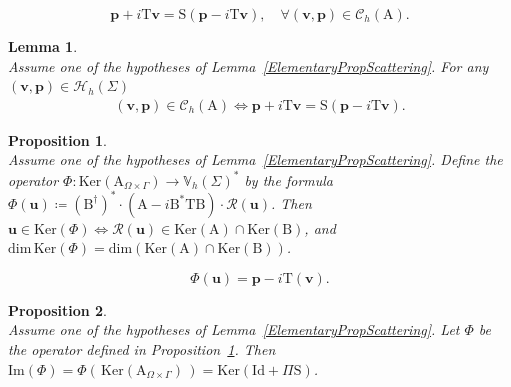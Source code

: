 \documentclass[10pt,a4paper]{amsart}
\newtheorem{lem}{Lemma}
\newtheorem{prop}{Proposition}
\newcommand{\Id}{\mathrm{Id}}
\newcommand{\bp}{\boldsymbol{p}}
\newcommand{\bu}{\boldsymbol{u}}
\newcommand{\bv}{\boldsymbol{v}}
\newcommand{\mA}{\mathrm{A}}
\newcommand{\mB}{\mathrm{B}}
\newcommand{\mS}{\mathrm{S}}
\newcommand{\mT}{\mathrm{T}}
\newcommand{\mbV}{\mathbb{V}}
\newcommand{\mrm}{\mathrm}
\begin{document}
  \begin{equation}\label{ScatteringOperator}
    \bp+i\mT\bv = \mS(\bp-i\mT\bv),\quad \forall (\bv,\bp)\in
    \mathscr{C}_h(\mA).
  \end{equation}

\begin{lem}\label{ScatteringOperatorChara}\quad\\
  Assume one of the hypotheses of Lemma~\ref{ElementaryPropScattering}. For any \((\bv,\bp)\in \mathscr{H}_h(\Sigma)\)
  \begin{align*}
    (\bv,\bp)\in \mathscr{C}_h(\mA) \Longleftrightarrow \bp+i\mT\bv = \mS(\bp-i\mT\bv). 
  \end{align*}
\end{lem}

\begin{prop}\label{IsomorphismKernels1}\quad\\
  Assume one of the hypotheses of Lemma~\ref{ElementaryPropScattering}. Define the operator $\Phi\colon 
  \mrm{Ker}(\mA_{\Omega\times\Gamma})\to \mbV_h(\Sigma)^*$ by the formula
  $\Phi(\bu) \coloneq (\mB^{\dagger})^*\cdot(\mA-i\mB^*\mT\mB)\cdot\mathcal{R}(\bu)$.
  Then $\bu\in \mrm{Ker}(\Phi)\iff\mathcal{R}(\bu)\in \mrm{Ker}(\mA)\cap \mrm{Ker}(\mB)$, 
  and $\mrm{dim}\,\mrm{Ker}(\Phi) = \mrm{dim}(\mrm{Ker}(\mA)\cap \mrm{Ker}(\mB))$.
\end{prop}

\begin{equation}\label{IdentitePhiIntermediaire}
  \Phi(\bu) = \bp-i\mT(\bv).
\end{equation}

\begin{prop}\label{IsomorphismKernels2}\quad\\
  Assume one of the hypotheses of Lemma~\ref{ElementaryPropScattering}. 
  Let $\Phi$ be the operator defined in Proposition~\ref{IsomorphismKernels1}. 
  Then $\mrm{Im}(\Phi) = \Phi(\,\mrm{Ker}(\mA_{\Omega\times\Gamma})\,) = \mrm{Ker}(\Id+\Pi\mS)$.
\end{prop}
\end{document}
